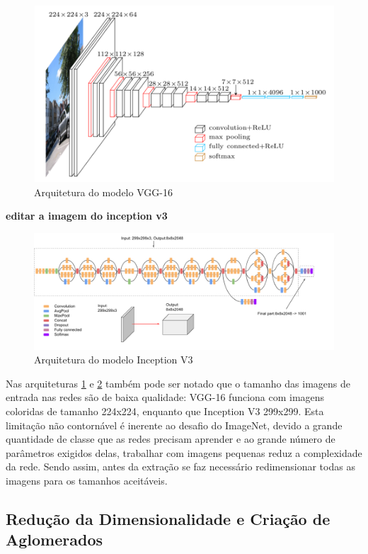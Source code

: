 \documentclass[12pt]{report}
\begin{document}
\begin{figure}[width=\textwidth]
    \centering
    \includegraphics[scale=0.7]{images/vgg16.PNG}
    \caption{Arquitetura do modelo VGG-16}
    \label{fig:vgg16}
\end{figure}

\textbf{editar a imagem do inception v3}

\begin{figure}[width=\textwidth]
    \centering
    \includegraphics[scale=0.5]{images/inceptionv3.png}
    \caption{Arquitetura do modelo Inception V3}
    \label{fig:inceptionv3}
\end{figure}

Nas arquiteturas \ref{fig:vgg16} e \ref{fig:inceptionv3} também pode ser notado que o tamanho das imagens de entrada nas redes são de baixa qualidade: VGG-16 funciona com imagens coloridas de tamanho 224x224, enquanto que Inception V3 299x299. Esta limitação não contornável é inerente ao desafio do ImageNet, devido a grande quantidade de classe que as redes precisam aprender e ao grande número de parâmetros exigidos delas, trabalhar com imagens pequenas reduz a complexidade da rede. Sendo assim, antes da extração se faz necessário redimensionar todas as imagens para os tamanhos aceitáveis. 

\subsection{Redução da Dimensionalidade e Criação de Aglomerados}
\end{document}
